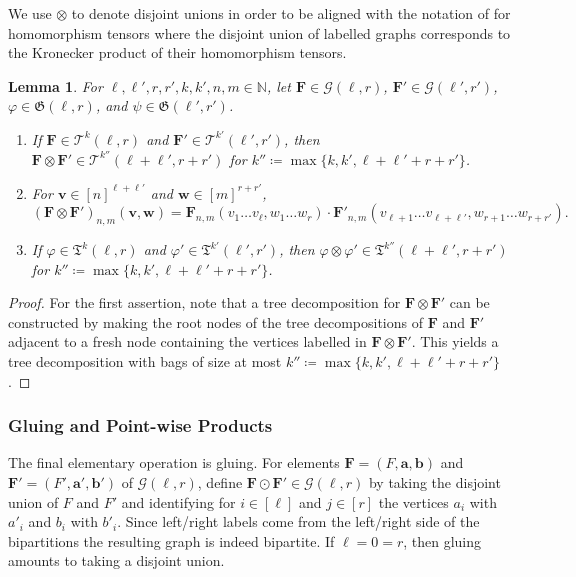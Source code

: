 \documentclass[10pt,a4paper]{article}
\theoremstyle{definition}
\theoremstyle{plain}
\newtheorem{lemma}[definition]{Lemma}
\theoremstyle{remark}
\renewcommand{\phi}{\varphi}
\begin{document}
	We use $\otimes$ to denote disjoint unions in order to be aligned with the notation of \cite{mancinska_quantum_2020,seppelt_homomorphism_2024} for homomorphism tensors where the disjoint union of labelled graphs corresponds to the Kronecker product of their homomorphism tensors.
	\begin{lemma}\label{lem:disjoint-union}
		For $\ell, \ell', r,r', k, k', n, m \in \mathbb{N}$,
		let $\boldsymbol{F} \in \mathcal{G}(\ell, r)$,  $\boldsymbol{F}' \in \mathcal{G}(\ell', r')$,  $\phi \in \mathfrak{G}(\ell, r)$, and $\psi \in \mathfrak{G}(\ell', r')$.
		\begin{enumerate}
			\item If $\boldsymbol{F} \in \mathcal{T}^k(\ell, r)$ and $\boldsymbol{F}' \in \mathcal{T}^{k'}(\ell', r')$, then $\boldsymbol{F} \otimes \boldsymbol{F}' \in \mathcal{T}^{k''}(\ell+\ell', r+r')$ for $k'' \coloneqq \max\{k,k', \ell+\ell'+r+r'\}$.
			\item For $\boldsymbol{v} \in [n]^{\ell+\ell'}$ and $\boldsymbol{w} \in [m]^{r+r'}$, 
			\[
				(\boldsymbol{F} \otimes \boldsymbol{F}')_{n,m}(\boldsymbol{v}, \boldsymbol{w}) = \boldsymbol{F}_{n,m}(v_1 \dots v_\ell, w_1 \dots w_r) \cdot \boldsymbol{F}'_{n,m}(v_{\ell+1} \dots v_{\ell+ \ell'}, w_{r+1} \dots w_{r+r'}).
			\]
			\item If $\phi \in \mathfrak{T}^k(\ell, r)$ and $\phi' \in \mathfrak{T}^{k'}(\ell', r')$,
			then $\phi \otimes \phi' \in \mathfrak{T}^{k''}(\ell+\ell', r+r')$ for $k'' \coloneqq \max\{k,k', \ell+\ell'+r+r'\}$.
		\end{enumerate}
	\end{lemma}
	\begin{proof}
		For the first assertion, note that a tree decomposition for $\boldsymbol{F} \otimes \boldsymbol{F}'$ can be constructed by making the root nodes of the tree decompositions of $\boldsymbol{F}$ and $\boldsymbol{F}'$ adjacent to a fresh node containing the vertices labelled in $\boldsymbol{F} \otimes \boldsymbol{F}'$.
		This yields a tree decomposition with bags of size at most $k'' \coloneqq \max\{k,k', \ell+\ell'+r+r'\}$.
	\end{proof}

	\subsubsection{Gluing and Point-wise Products}
	The final elementary operation is gluing.
	For elements $\boldsymbol{F} = (F, \boldsymbol{a}, \boldsymbol{b})$ and $\boldsymbol{F}' = (F', \boldsymbol{a}', \boldsymbol{b}')$ of $\mathcal{G}(\ell, r)$,
	define $\boldsymbol{F} \odot \boldsymbol{F}' \in \mathcal{G}(\ell, r)$
	by taking the disjoint union of $F$ and $F'$ and identifying for $i \in [\ell]$ and $j \in [r]$ the vertices $a_i$ with $a'_i$ and $b_i$ with $b'_i$.
	Since left/right labels come from the left/right side of the bipartitions the resulting graph is indeed bipartite.
	If $\ell = 0 = r$, then gluing amounts to taking a disjoint union.
	
\end{document}
